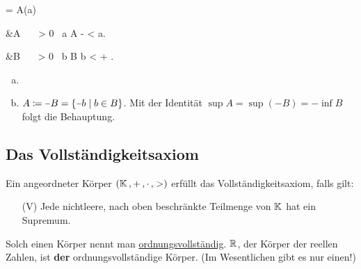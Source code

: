 \documentclass[../ana1.tex]{subfiles}
\begin{document}
\begin{lem}\label{satz:epskrit_inf_sup}\leavevmode
		\begin{alignenum}{\alpha = \sup A}{(a)}
			\begin{aitem}
				 &\iff \alpha \geq A  \, \wedge  \, \forall \, \varepsilon > 0  \, \exists a \in A \colon \; \alpha - \varepsilon < a.
			\end{aitem}\begin{aitem}
				 &\iff \beta  \leq B  \, \wedge  \, \forall \, \varepsilon > 0  \, \exists b \in B \colon \; b < \beta + \varepsilon.
			\end{aitem}
		\end{alignenum}
\end{lem}
\begin{bew}\leavevmode
	\begin{enumerate}[(a)]
		\item {}
		\item \(A \coloneqq \minus B = \set{\minus b  \;\vert  \;b \in B} \). Mit der Identität
			  \(\sup A = \sup(\minus B) = \minus \inf B \) folgt die Behauptung.\qedhere
	\end{enumerate}
\end{bew}


\subsection{Das Vollständigkeitsaxiom}

\begin{defi}
	Ein angeordneter Körper \((\mathbb{K} \operatorname{,} + \operatorname{,} \cdot \operatorname{,} >) \) erfüllt das Voll\-ständig\-keits\-axiom, falls gilt:
	\begin{enumerate}
		\item[(V)]\label{ax:V}Jede nichtleere, nach oben beschränkte Teilmenge von \(\mathbb{K} \) hat ein Supremum.
	\end{enumerate}
	Solch einen Körper nennt man \underline{ordnungsvollständig}. \(\mathbb{R} \), der Körper der reellen Zahlen, ist \textbf{der} ordnungsvollständige Körper. (Im Wesentlichen gibt es nur einen!)
\end{defi}
\end{document}
